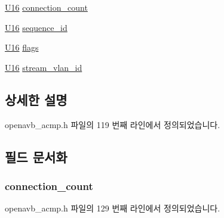 \begin{DoxyCompactItemize}
\hyperlink{openavb__types__base__pub_8h_a0a0a322d5fa4a546d293a77ba8b4a71f}{U16} \hyperlink{structopenavb__acmp___a_c_m_p_command_response__t_ad1ff24268593562ac5896a238d895b81}{connection\+\_\+count}
\item 
\hyperlink{openavb__types__base__pub_8h_a0a0a322d5fa4a546d293a77ba8b4a71f}{U16} \hyperlink{structopenavb__acmp___a_c_m_p_command_response__t_ada45e1a0fe13471280842df714983d95}{sequence\+\_\+id}
\item 
\hyperlink{openavb__types__base__pub_8h_a0a0a322d5fa4a546d293a77ba8b4a71f}{U16} \hyperlink{structopenavb__acmp___a_c_m_p_command_response__t_a492b33861e809623846e5256d271bc78}{flags}
\item 
\hyperlink{openavb__types__base__pub_8h_a0a0a322d5fa4a546d293a77ba8b4a71f}{U16} \hyperlink{structopenavb__acmp___a_c_m_p_command_response__t_a31db70d552fc6f5d35875430fca593e6}{stream\+\_\+vlan\+\_\+id}
\end{DoxyCompactItemize}


\subsection{상세한 설명}


openavb\+\_\+acmp.\+h 파일의 119 번째 라인에서 정의되었습니다.



\subsection{필드 문서화}
\subsubsection[{\texorpdfstring{connection\+\_\+count}{connection_count}}]{ connection\+\_\+count}\hypertarget{structopenavb__acmp___a_c_m_p_command_response__t_ad1ff24268593562ac5896a238d895b81}{}\label{structopenavb__acmp___a_c_m_p_command_response__t_ad1ff24268593562ac5896a238d895b81}


openavb\+\_\+acmp.\+h 파일의 129 번째 라인에서 정의되었습니다.

